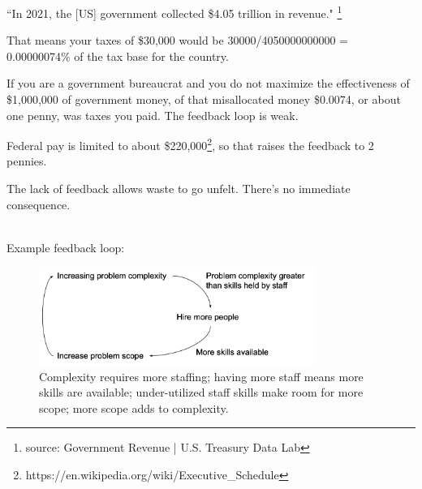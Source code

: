 ``In 2021, the [US] government collected \$4.05 trillion in revenue."
\footnote{source: Government Revenue | U.S. Treasury Data Lab}

That means your taxes of \$30,000 would be
30000/4050000000000 = 0.00000074\% of the tax base for the country.

If you are a government bureaucrat and you do not maximize the effectiveness of \$1,000,000 of government money, of that misallocated money \$0.0074, or about one penny, was taxes you paid. The feedback loop is weak.

Federal pay is limited to about \$220,000\footnote{https://en.wikipedia.org/wiki/Executive\_Schedule}, so that raises the feedback to 2 pennies.

The lack of feedback allows waste to go unfelt. There's no immediate consequence.

\ \\

Example feedback loop:
\begin{center}
\begin{figure}[ht]
    \centering
    \includegraphics[width=0.8\textwidth]{images/feedback_loop_complexity_and_staffing}
    \caption{Complexity requires more staffing; having more staff means more skills are available; under-utilized staff skills make room for more scope; more scope adds to complexity.}
    \label{fig:complexity_and_staff_growth}
\end{figure}
\end{center}

